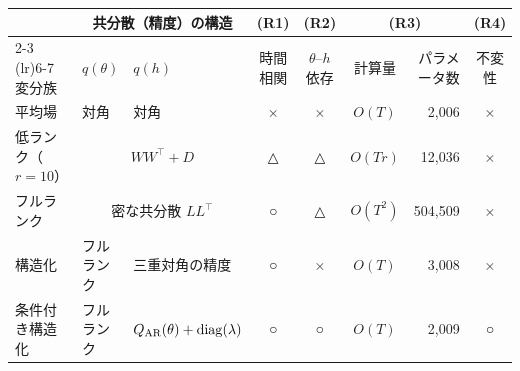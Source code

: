 \begin{tabular}{lllcccrc}
\toprule
 & \multicolumn{2}{c}{共分散（精度）の構造} & (R1) & (R2) & \multicolumn{2}{c}{(R3)} & (R4) \\
\cmidrule(lr){2-3} \cmidrule(lr){6-7}
変分族 & $q(\theta)$ & $q(h)$ & 時間相関 & $\theta$--$h$ 依存 & 計算量 & パラメータ数 & 不変性 \\
\midrule
平均場 & 対角 & 対角 & × & × & $O(T)$ & 2,006 & × \\
低ランク（$r=10$） & \multicolumn{2}{c}{$WW^\top + D$} & △ & △ & $O(Tr)$ & 12,036 & × \\
フルランク & \multicolumn{2}{c}{密な共分散 $LL^\top$} & ○ & △ & $O(T^2)$ & 504,509 & × \\
構造化 & フルランク & 三重対角の精度 & ○ & × & $O(T)$ & 3,008 & × \\
条件付き構造化 & フルランク & $Q_{\mathrm{AR}}(\theta) + \mathrm{diag}(\lambda)$ & ○ & ○ & $O(T)$ & 2,009 & ○ \\
\bottomrule
\end{tabular}
